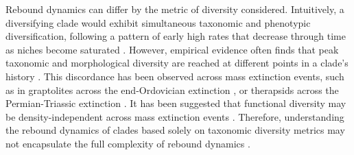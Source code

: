 \documentclass[titlepage]{article}
\begin{document}
Rebound dynamics can differ by the metric of diversity considered.
Intuitively, a diversifying clade would exhibit simultaneous taxonomic and phenotypic diversification, following a pattern of early high rates that decrease through time as niches become saturated \citep{schluter2000ecology}.
However, empirical evidence often finds that peak taxonomic and morphological diversity are reached at different points in a clade's history \citep{foote_discordance_1993, hopkins2013decoupling, ruta2013decoupling,wan2021decoupling}.
This discordance has been observed across mass extinction events, such as in graptolites across the end-Ordovician extinction \citep{bapst_graptoloid_2012}, or therapsids across the Permian-Triassic extinction \citep{ruta2013decoupling}.
It has been suggested that functional diversity may be density-independent across mass extinction events \citep{edie_contrasting_2018}.
Therefore, understanding the rebound dynamics of clades based solely on taxonomic diversity metrics may not encapsulate the full complexity of rebound dynamics \citep{puttick_complex_2020}. 







\end{document}
